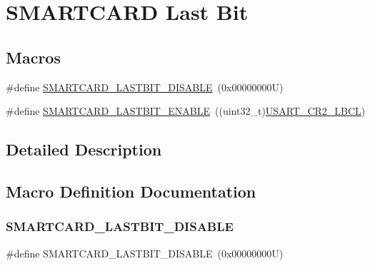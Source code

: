 \hypertarget{group___s_m_a_r_t_c_a_r_d___last___bit}{}\section{S\+M\+A\+R\+T\+C\+A\+RD Last Bit}
\label{group___s_m_a_r_t_c_a_r_d___last___bit}
\subsection*{Macros}
\begin{DoxyCompactItemize}
\item 
\#define \hyperlink{group___s_m_a_r_t_c_a_r_d___last___bit_ga8ce0dd5ed70e0ce9799c9b056363e884}{S\+M\+A\+R\+T\+C\+A\+R\+D\+\_\+\+L\+A\+S\+T\+B\+I\+T\+\_\+\+D\+I\+S\+A\+B\+LE}~(0x00000000\+U)
\item 
\#define \hyperlink{group___s_m_a_r_t_c_a_r_d___last___bit_ga11edb8d6ed3ba95eade9a1a6d35a2468}{S\+M\+A\+R\+T\+C\+A\+R\+D\+\_\+\+L\+A\+S\+T\+B\+I\+T\+\_\+\+E\+N\+A\+B\+LE}~((uint32\+\_\+t)\hyperlink{group___peripheral___registers___bits___definition_ga4a62e93ae7864e89622bdd92508b615e}{U\+S\+A\+R\+T\+\_\+\+C\+R2\+\_\+\+L\+B\+CL})
\end{DoxyCompactItemize}


\subsection{Detailed Description}


\subsection{Macro Definition Documentation}
\mbox{\label{group___s_m_a_r_t_c_a_r_d___last___bit_ga8ce0dd5ed70e0ce9799c9b056363e884}} 
\subsubsection{\texorpdfstring{S\+M\+A\+R\+T\+C\+A\+R\+D\+\_\+\+L\+A\+S\+T\+B\+I\+T\+\_\+\+D\+I\+S\+A\+B\+LE}{SMARTCARD\_LASTBIT\_DISABLE}}
{\footnotesize\ttfamily \#define S\+M\+A\+R\+T\+C\+A\+R\+D\+\_\+\+L\+A\+S\+T\+B\+I\+T\+\_\+\+D\+I\+S\+A\+B\+LE~(0x00000000\+U)}

